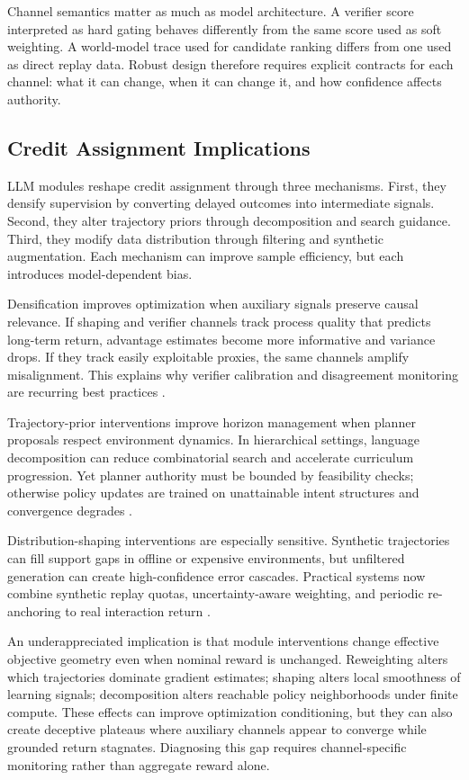 \documentclass[pdflatex,sn-mathphys-num]{sn-jnl}
\begin{document}
Channel semantics matter as much as model architecture. A verifier score interpreted as hard gating behaves differently from the same score used as soft weighting. A world-model trace used for candidate ranking differs from one used as direct replay data. Robust design therefore requires explicit contracts for each channel: what it can change, when it can change it, and how confidence affects authority.

\subsection{Credit Assignment Implications}
LLM modules reshape credit assignment through three mechanisms. First, they densify supervision by converting delayed outcomes into intermediate signals. Second, they alter trajectory priors through decomposition and search guidance. Third, they modify data distribution through filtering and synthetic augmentation. Each mechanism can improve sample efficiency, but each introduces model-dependent bias.

Densification improves optimization when auxiliary signals preserve causal relevance. If shaping and verifier channels track process quality that predicts long-term return, advantage estimates become more informative and variance drops. If they track easily exploitable proxies, the same channels amplify misalignment. This explains why verifier calibration and disagreement monitoring are recurring best practices \cite{arxiv_p_2602_06493,arxiv_p_2602_12579,arxiv_p_2508_03680,arxiv_p_2602_02395}.

Trajectory-prior interventions improve horizon management when planner proposals respect environment dynamics. In hierarchical settings, language decomposition can reduce combinatorial search and accelerate curriculum progression. Yet planner authority must be bounded by feasibility checks; otherwise policy updates are trained on unattainable intent structures and convergence degrades \cite{arxiv_p_2602_16165,arxiv_p_2510_24699,arxiv_p_2512_20275}.

Distribution-shaping interventions are especially sensitive. Synthetic trajectories can fill support gaps in offline or expensive environments, but unfiltered generation can create high-confidence error cascades. Practical systems now combine synthetic replay quotas, uncertainty-aware weighting, and periodic re-anchoring to real interaction return \cite{arxiv_p_2601_08107,arxiv_p_2602_14468,arxiv_p_2601_22149}.

An underappreciated implication is that module interventions change effective objective geometry even when nominal reward is unchanged. Reweighting alters which trajectories dominate gradient estimates; shaping alters local smoothness of learning signals; decomposition alters reachable policy neighborhoods under finite compute. These effects can improve optimization conditioning, but they can also create deceptive plateaus where auxiliary channels appear to converge while grounded return stagnates. Diagnosing this gap requires channel-specific monitoring rather than aggregate reward alone.
\end{document}
